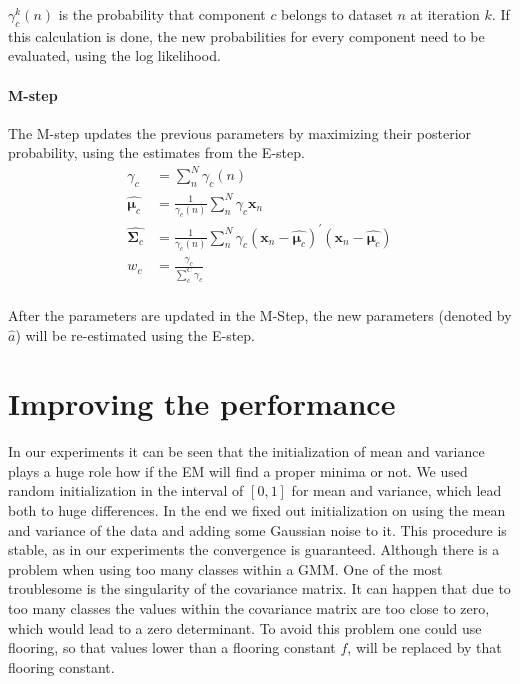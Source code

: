 $\gamma_c^k(n)$ is the probability that component $c$ belongs to dataset $n$ at iteration $k$. If this calculation is done, the new probabilities for every component need to be evaluated, using the log likelihood.
\paragraph*{M-step}
The M-step updates the previous parameters by maximizing their posterior probability, using the estimates from the E-step.
\begin{equation}
\begin{split}
\gamma_c &= \sum\limits_n^N \gamma_{c}(n) \\
\hat{\boldsymbol{\mu}_c} &=\frac{1}{\gamma_c(n)} \sum\limits_n^N \gamma_c \mathbf{x}_n \\
\hat{\mathbf{\Sigma}_c} &=\frac{1}{\gamma_c(n)} \sum\limits_n^N \gamma_c \left( \mathbf{x}_n - \hat{\boldsymbol{\mu}_c} \right)^{'} \left( \mathbf{x}_n - \hat{\boldsymbol{\mu}_c} \right) \\
w_c &= \frac{\gamma_c}{\sum\limits_c^C \gamma_c} \\
\end{split}
\end{equation}

After the parameters are updated in the M-Step, the new parameters (denoted by $\hat{a} $) will be re-estimated using the E-step.

\section{Improving the performance}
In our experiments it can be seen that the initialization of mean and variance plays a huge role how if the EM will find a proper minima or not. We used random initialization in the interval of $ [0,1]$ for mean and variance, which lead both to huge differences. 
In the end we fixed out initialization on using the mean and variance of the data and adding some Gaussian noise to it. This procedure is stable, as in our experiments the convergence is guaranteed.
Although there is a problem when using too many classes within a GMM. One of the most troublesome is the singularity of the covariance matrix. It can happen that due to too many classes the values within the covariance matrix are too close to zero, which would lead to a zero determinant. To avoid this problem one could use flooring, so that values lower than a flooring constant $f$, will be replaced by that flooring constant.

